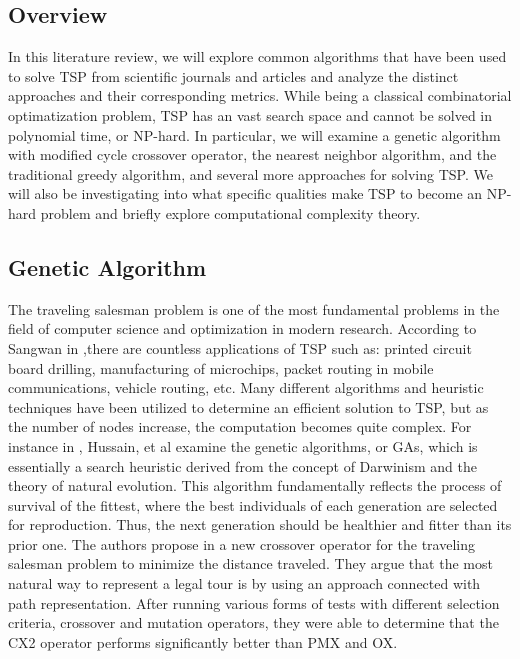 \documentclass{article}
\begin{document}
\subsection{Overview}
In this literature review, we will explore common algorithms that have been used to solve TSP from scientific journals and articles and analyze the distinct approaches and their corresponding metrics. While being a classical combinatorial optimatization problem, TSP has an vast search space and cannot be solved in polynomial time, or NP-hard. In particular, we will examine a genetic algorithm with modified cycle crossover operator, the nearest neighbor algorithm, and the traditional greedy algorithm, and several more approaches for solving TSP. We will also be investigating into what specific qualities make TSP to become an NP-hard problem and briefly explore computational complexity theory. 
  
\subsection{Genetic Algorithm}
The traveling salesman problem is one of the most fundamental problems in the field of computer science and optimization in modern research. According to Sangwan in \cite{sangwan},there are countless applications of TSP such as: printed circuit board drilling, manufacturing of microchips, packet routing in mobile communications, vehicle routing, etc. Many different algorithms and heuristic techniques have been utilized to determine an efficient solution to TSP, but as the number of nodes increase, the computation becomes quite complex. For instance in \cite{hussain}, Hussain, et al examine the genetic algorithms, or GAs, which is essentially a search heuristic derived from the concept of Darwinism and the theory of natural evolution. This algorithm fundamentally reflects the process of survival of the fittest, where the best individuals of each generation are selected for reproduction. Thus, the next generation should be healthier and fitter than its prior one. The authors propose in \cite{hussain} a new crossover operator for the traveling salesman problem to minimize the distance traveled. They argue that the most natural way to represent a legal tour is by using an approach connected with path representation. After running various forms of tests with different selection criteria, crossover and mutation operators, they were able to determine that the CX2 operator performs significantly better than PMX and OX. \\
\end{document}
